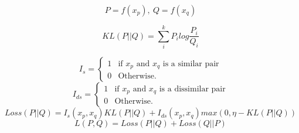\begin{equation*}
  P = f(x_p), ~ Q = f(x_q)
\end{equation*}

\begin{equation*}
  KL(P||Q) = \sum_i^k P_ilog\frac{P_i}{Q_i}
\end{equation*}

\begin{equation*}
  I_s = \left\{
\begin{array}{ll}
  1 & \mbox{if $x_p$ and $x_q$ is a similar pair}\\
  0 & \mbox{Otherwise.}
\end{array}
\right.
\end{equation*}
%
\begin{equation*}
  I_{ds} = \left\{
\begin{array}{ll}
  1 & \mbox{if $x_p$ and $x_q$ is a dissimilar pair}\\
  0 & \mbox{Otherwise.}
\end{array}
\right.
\end{equation*}
\begin{equation*}
  Loss(P || Q) = I_s(x_p, x_q)KL(P || Q) + I_{ds}(x_p, x_q)max(0,
  \eta-KL(P||Q))
\end{equation*}
\begin{equation*}
  L(P,Q) = Loss(P || Q) + Loss(Q || P)
\end{equation*}
